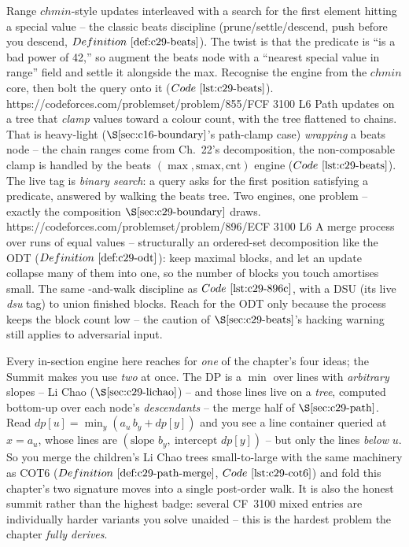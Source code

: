 \begin{mixedset}
    {Range \(\mathit{chmin}\)-style updates interleaved with a search for the first element hitting a
     special value -- the classic beats discipline (prune/settle/descend, push before you descend,
     \(\defref{c29-beats}\)). The twist is that the predicate is ``is a bad power of 42,'' so augment
     the beats node with a ``nearest special value in range'' field and settle it alongside the max.
     Recognise the engine from the \(\mathit{chmin}\) core, then bolt the query onto it
     (\(\coderef{c29-beats}\)).}
    {https://codeforces.com/problemset/problem/855/F}{CF 3100 L6}
    {Path updates on a tree that \emph{clamp} values toward a colour count, with the tree flattened to
     chains. That is heavy-light (\(\secref{c16-boundary}\)'s path-clamp case) \emph{wrapping} a beats
     node -- the chain ranges come from Ch.~22's decomposition, the non-composable clamp is handled by
     the beats \((\max,\mathrm{smax},\mathrm{cnt})\) engine (\(\coderef{c29-beats}\)). The live tag is
     \emph{binary search}: a query asks for the first position satisfying a predicate, answered by
     walking the beats tree. Two engines, one problem -- exactly the composition \(\secref{c29-boundary}\)
     draws.}
    {https://codeforces.com/problemset/problem/896/E}{CF 3100 L6}
    {A merge process over runs of equal values -- structurally an ordered-set decomposition like the
     ODT (\(\defref{c29-odt}\)): keep maximal blocks, and let an update collapse many of them into one,
     so the number of blocks you touch amortises small. The same -and-walk discipline as
     \(\coderef{c29-896c}\), with a DSU (its live \emph{dsu} tag) to union finished blocks. Reach for
     the ODT only because the process keeps the block count low -- the caution of
     \(\secref{c29-beats}\)'s hacking warning still applies to adversarial input.}
\end{mixedset}



\begin{notebox}
Every in-section engine here reaches for \emph{one} of the chapter's four ideas; the Summit makes you
use \emph{two} at once. The DP is a \(\min\) over lines with \emph{arbitrary} slopes -- Li Chao
(\(\secref{c29-lichao}\)) -- and those lines live on a \emph{tree}, computed bottom-up over each node's
\emph{descendants} -- the merge half of \(\secref{c29-path}\). Read \(\mathit{dp}[u]=\min_{y}
(a_u\,b_y+\mathit{dp}[y])\) and you see a line container queried at \(x=a_u\), whose lines are
\((\text{slope } b_y,\ \text{intercept } \mathit{dp}[y])\) -- but only the lines \emph{below} \(u\). So
you merge the children's Li Chao trees small-to-large with the same machinery as COT6
(\(\defref{c29-path-merge}\), \(\coderef{c29-cot6}\)) and fold this chapter's two signature moves into
a single post-order walk. It is also the honest summit rather than the highest badge: several CF~3100
mixed entries are individually harder variants you solve unaided -- this is the hardest problem the
chapter \emph{fully derives}.
\end{notebox}

